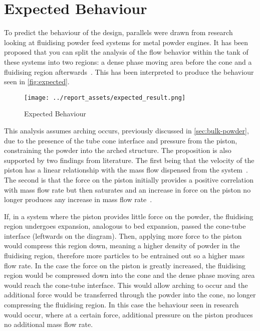 \section{Expected Behaviour}
To predict the behaviour of the design, parallels were drawn from research looking at fluidising powder feed systems for metal powder engines. It has been proposed that you can split the analysis of the flow behavior within the tank of these systems into two regions: a dense phase moving area before the cone and a fluidising region afterwards~\cite{Tang22}. This has been interpreted to produce the behaviour seen in \autoref{fig:expected}. 
\begin{figure}[htbp]
    \centering
    
    \begin{minipage}{0.6\textwidth}
        \centering
        \texttt{[image: ../report\_assets/expected\_result.png]}
        \caption{Expected Behaviour}\label{fig:expected}
    \end{minipage}
    
\end{figure}
This analysis assumes arching occurs, previously discussed in \autoref{sec:bulk-powder}, due to the presence of the tube cone interface and pressure from the piston, constraining the powder into the arched structure. The proposition is also supported by two findings from literature. The first being that the velocity of the piston has a linear relationship with the mass flow dispensed from the system~\cite{SUN201630}. The second is that the force on the piston initially provides a positive correlation with mass flow rate but then saturates and an increase in force on the piston no longer produces any increase in mass flow rate~\cite{LI2021712}. 

If, in a system where the piston provides little force on the powder, the fluidising region undergoes expansion, analogous to bed expansion, passed the cone-tube interface (leftwards on the diagram). Then, applying more force to the piston would compress this region down, meaning a higher density of powder in the fluidising region, therefore more particles to be entrained out so a higher mass flow rate. In the case the force on the piston is greatly increased, the fluidising region would be compressed down into the cone and the dense phase moving area would reach the cone-tube interface. This would allow arching to occur and the additional force would be transferred through the powder into the cone, no longer compressing the fluidising region. In this case the behaviour seen in research would occur, where at a certain force, additional pressure on the piston produces no additional mass flow rate. 

